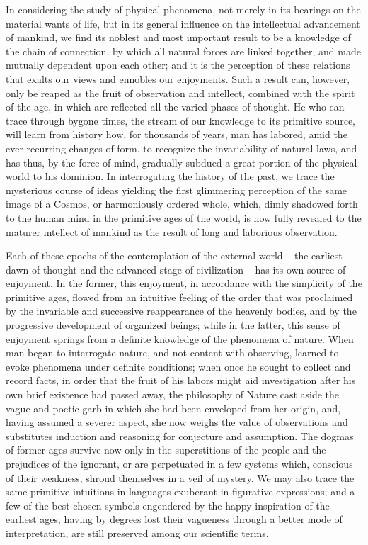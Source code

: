 In considering the study of physical phenomena, not merely in its bearings on the material wants of life, but in its general influence on the intellectual advancement of mankind, we find its noblest and most important result to be a knowledge of the chain of connection, by which all natural forces are linked together, and made mutually dependent upon each other; and it is the perception of these relations that exalts our views and ennobles our enjoyments. Such a result can, however, only be reaped as the fruit of observation and intellect, combined with the spirit of the age, in which are reflected all the varied phases of thought. He who can trace through bygone times, the stream of our knowledge to its primitive source, will learn from history how, for thousands of years, man has labored, amid the ever recurring changes of form, to recognize the invariability of natural laws, and has thus, by the force of mind, gradually subdued a great portion of the physical world to his dominion. In interrogating the history of the past, we trace the mysterious course of ideas yielding the first glimmering perception of the same image of a Cosmos, or harmoniously ordered whole, which, dimly shadowed forth to the human mind in the primitive ages of the world, is now fully revealed to the maturer intellect of mankind as the result of long and laborious observation.

Each of these epochs of the contemplation of the external world -- the earliest dawn of thought and the advanced stage of civilization -- has its own source of enjoyment. In the former, this enjoyment, in accordance with the simplicity of the primitive ages, flowed from an intuitive feeling of the order that was proclaimed by the invariable and successive reappearance of the heavenly bodies, and by the progressive development of organized beings; while in the latter, this sense of enjoyment springs from a definite knowledge of the phenomena of nature. When man began to interrogate nature, and not content with observing, learned to evoke phenomena under definite conditions; when once he sought to collect and record facts, in order that the fruit of his labors might aid investigation after his own brief existence had passed away, the philosophy of Nature cast aside the vague and poetic garb in which she had been enveloped from her origin, and, having assumed a severer aspect, she now weighs the value of observations and substitutes induction and reasoning for conjecture and assumption. The dogmas of former ages survive now only in the superstitions of the people and the prejudices of the ignorant, or are perpetuated in a few systems which, conscious of their weakness, shroud themselves in a veil of mystery. We may also trace the same primitive intuitions in languages exuberant in figurative expressions; and a few of the best chosen symbols engendered by the happy inspiration of the earliest ages, having by degrees lost their vagueness through a better mode of interpretation, are still preserved among our scientific terms.

